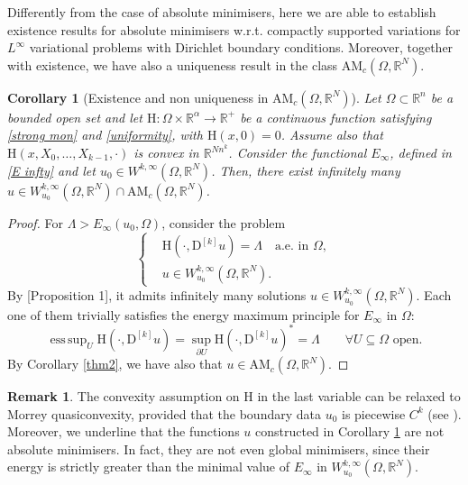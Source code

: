 \documentclass[a4paper,11pt]{article}
\numberwithin{equation}{section}
\newtheorem{Corollary}[Theorem]{Corollary}
\newcommand{\numberset}{\mathbb}
\newcommand{\Om}{\Omega}
\newcommand{\R}{\numberset{R}}
\newcommand{\rom}{\mathrm}
\DeclareMathOperator*{\esssup}{ess\,sup}
\theoremstyle{definition}
\newtheorem{Remark}[Theorem]{Remark}
\begin{document}
Differently from the case of absolute minimisers, here we are able to establish existence results for absolute minimisers w.r.t. compactly supported variations for $L^\infty$ variational problems with Dirichlet boundary conditions. Moreover, together with existence, we have also a uniqueness result in the class $\mathrm {AM}_c(\Om,\R^N)$.
\begin{Corollary}[Existence and non uniqueness in $\mathrm {AM}_c(\Om,\R^N)$]\label{cor}
Let $\Om\subset\R^n$ be a bounded open set and let $\rom{H}:\Om\times\R^\alpha\to\R^+$ be a continuous function satisfying \eqref{strong mon} and \eqref{uniformity}, with $\rom{H}(x,0)=0$. Assume also that $\rom H(x,X_0,\ldots,X_{k-1}, \cdot)$ is convex in $\R^{Nn^k}$. Consider the functional $E_\infty$, defined in \eqref{E infty} and let $u_0\in W^{k,\infty}(\Om,\R^N)$. Then, there exist infinitely many $u\in W^{k,\infty}_{u_0}(\Om,\R^N)\cap \mathrm{AM}_c(\Om,\R^N)$.
\end{Corollary}
\begin{proof}
For $\Lambda>E_\infty(u_0,\Om)$, consider the problem
\begin{equation}\nonumber
\left\{
\begin{aligned}
&\rom H(\cdot, \rom D^{[k]}u)=\Lambda \quad\mbox{a.e. in }\Om,\\
&u\in W^{k,\infty}_{u_0}(\Om,\R^N).
\end{aligned}
\right.
\end{equation}
By \cite{K5}[Proposition 1], it admits infinitely many solutions $u\in W^{k,\infty}_{u_0}(\Om,\R^N)$. Each one of them trivially satisfies the energy maximum principle for $E_\infty$ in $\Om$:
$$
\esssup_U \rom{H}(\cdot, \mathrm D ^{[k]}u)=\sup_{\partial U}\rom{H}(\cdot,\mathrm D ^{[k]}u)^*=\Lambda\qquad\forall U\subseteq\Om \mbox{ open}.
$$
By Corollary \ref{thm2}, we have also that $u\in \mathrm{AM}_c(\Om,\R^N)$.
\end{proof}

\begin{Remark}
The convexity assumption on $\rom H$ in the last variable can be relaxed to Morrey quasiconvexity, provided that the boundary data $u_0$ is piecewise $C^k$ (see \cite{K5}).\\
Moreover, we underline that the functions $u$ constructed in Corollary \ref{cor} are not absolute minimisers. In fact, they are not even global minimisers, since their energy is strictly greater than the minimal value of $E_\infty$ in $W^{k,\infty}_{u_0}(\Om,\R^N)$.
\end{Remark}
\end{document}
